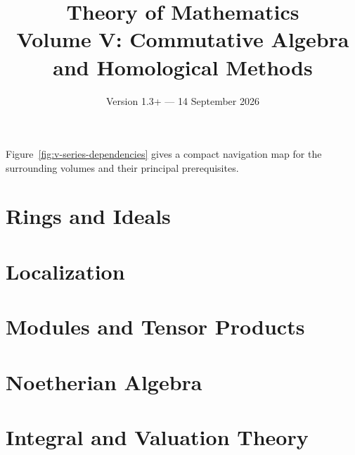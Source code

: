 \documentclass[11pt,a4paper,oneside,openany]{book}
\title{Theory of Mathematics\\[0.5em]\Large Volume V: Commutative Algebra and Homological Methods}
\author{}
\date{Version 1.3+ --- 14 September 2026}
\begin{document}
\maketitle
\clearpage
\frontmatter
\tableofcontents


Figure~\ref{fig:v-series-dependencies} gives a compact navigation map for the
surrounding volumes and their principal prerequisites.


\mainmatter

\part{Rings and Ideals}





\part{Localization}





\part{Modules and Tensor Products}







\part{Noetherian Algebra}





\part{Integral and Valuation Theory}



\end{document}
